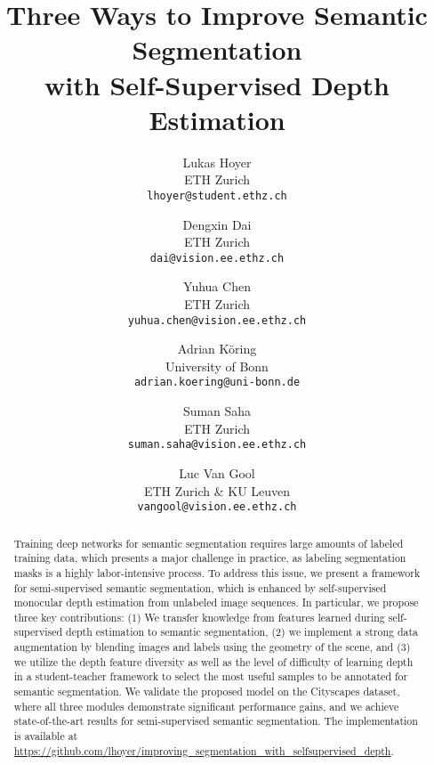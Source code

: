 \documentclass[final]{cvpr}
\begin{document}
\title{Three Ways to Improve Semantic Segmentation\\ with Self-Supervised Depth Estimation}

\clearpage{}\author{Lukas Hoyer\\
ETH Zurich\\
{\tt\small lhoyer@student.ethz.ch}
\and
Dengxin Dai\\
ETH Zurich\\
{\tt\small dai@vision.ee.ethz.ch}
\and
Yuhua Chen\\
ETH Zurich\\
{\tt\small yuhua.chen@vision.ee.ethz.ch}
\and
Adrian Köring\\
University of Bonn\\
{\tt\small adrian.koering@uni-bonn.de}
\and
Suman Saha\\
ETH Zurich \\
{\tt\small suman.saha@vision.ee.ethz.ch}
\and
Luc Van Gool\\
ETH Zurich \& KU Leuven\\
{\tt\small vangool@vision.ee.ethz.ch}
}\clearpage{}

\maketitle


\begin{abstract}

Training deep networks for semantic segmentation requires large amounts of labeled training data, which presents a major challenge in practice, as labeling segmentation masks is a highly labor-intensive process. To address this issue, we present a framework for semi-supervised semantic segmentation, which is enhanced by self-supervised monocular depth estimation from unlabeled image sequences. 
In particular, we propose three key contributions: (1) We transfer knowledge from features learned during self-supervised depth estimation to semantic segmentation, (2) we implement a strong data augmentation by blending images and labels using the geometry of the scene, and (3) we utilize the depth feature diversity as well as the level of difficulty of learning depth in a student-teacher framework to select the most useful samples to be annotated for semantic segmentation.
We validate the proposed model on the Cityscapes dataset, where all three modules demonstrate significant performance gains, and we achieve state-of-the-art results for semi-supervised semantic segmentation. The implementation is available at \footnotesize{\url{https://github.com/lhoyer/improving_segmentation_with_selfsupervised_depth}}.
\end{abstract}
\end{document}
